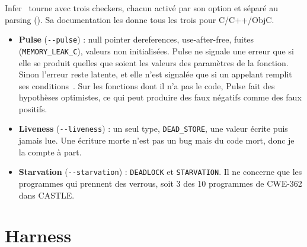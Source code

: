 \documentclass[11pt,a4paper]{article}
\let\fichier\path
\begin{document}
Infer~\cite{infer} tourne avec trois checkers, chacun activé par son option et séparé au parsing
(\fichier{harness/normalize.py}). Sa documentation les donne tous les trois pour C/C++/ObjC.
\begin{itemize}
  \item \textbf{Pulse} (\texttt{-{}-pulse}) : null pointer dereferences, use-after-free, fuites
  (\texttt{MEMORY\_LEAK\_C}), valeurs non initialisées. Pulse ne signale une erreur que si elle se produit quelles
  que soient les valeurs des paramètres de la fonction. Sinon l'erreur reste latente, et elle n'est signalée que
  si un appelant remplit ses conditions~\cite{pulse}. Sur les fonctions dont il n'a pas le code, Pulse fait des
  hypothèses optimistes, ce qui peut produire des faux négatifs comme des faux positifs.
  \item \textbf{Liveness} (\texttt{-{}-liveness}) : un seul type, \texttt{DEAD\_STORE}, une valeur écrite puis
  jamais lue. Une écriture morte n'est pas un bug mais du code mort, donc je la compte à part.
  \item \textbf{Starvation} (\texttt{-{}-starvation}) : \texttt{DEADLOCK} et \texttt{STARVATION}. Il ne concerne que
  les programmes qui prennent des verrous, soit 3 des 10 programmes de CWE-362 dans CASTLE.
\end{itemize}

\section{Harness}
\end{document}
